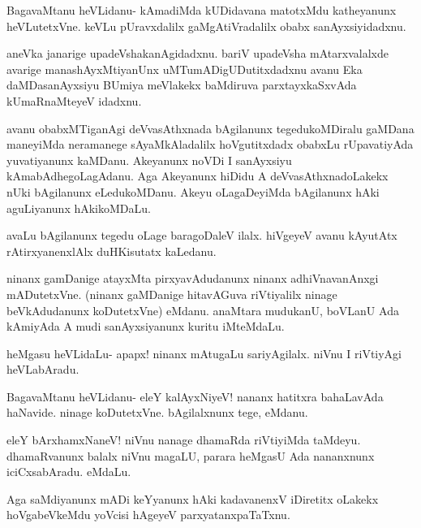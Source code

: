 \documentclass{article}
\begin{document}
\begin{mng}%
BagavaMtanu heVLidanu- kAmadiMda kUDidavana matotxMdu katheyanunx 
heVLutetxVne. keVLu pUravxdalilx gaMgAtiVradalilx obabx sanAyxsiyidadxnu.
\end{mng}

\begin{mng}%
aneVka janarige upadeVshakanAgidadxnu. bariV upadeVsha mAtarxvalalxde
avarige manashAyxMtiyanUnx uMTumADigUDutitxdadxnu avanu Eka
daMDasanAyxsiyu BUmiya meVlakekx baMdiruva parxtayxkaSxvAda kUmaRnaMteyeV
idadxnu.
\end{mng}

\begin{mng}%
avanu obabxMTiganAgi deVvasAthxnada bAgilanunx tegedukoMDiralu
gaMDana maneyiMda neramanege sAyaMkAladalilx hoVgutitxdadx obabxLu
rUpavatiyAda yuvatiyanunx kaMDanu. Akeyanunx noVDi I sanAyxsiyu
kAmabAdhegoLagAdanu. Aga Akeyanunx hiDidu A deVvasAthxnadoLakekx
nUki bAgilanunx eLedukoMDanu. Akeyu oLagaDeyiMda bAgilanunx hAki
aguLiyanunx hAkikoMDaLu.
\end{mng}

\begin{mng}%
avaLu bAgilanunx tegedu oLage baragoDaleV ilalx. hiVgeyeV
avanu kAyutAtx rAtirxyanenxlAlx duHKisutatx kaLedanu.
\end{mng}

\begin{mng}%
ninanx gamDanige atayxMta pirxyavAdudanunx ninanx adhiVnavanAnxgi
mADutetxVne. (ninanx gaMDanige hitavAGuva riVtiyalilx ninage beVkAdudanunx
koDutetxVne) eMdanu. anaMtara mudukanU, boVLanU Ada kAmiyAda
A mudi sanAyxsiyanunx kuritu iMteMdaLu.
\end{mng}

\begin{mng}%
heMgasu heVLidaLu- apapx! ninanx mAtugaLu sariyAgilalx.
niVnu I riVtiyAgi heVLabAradu.
\end{mng}

\begin{mng}%
BagavaMtanu heVLidanu- eleY kalAyxNiyeV! nananx hatitxra bahaLavAda
haNavide. ninage koDutetxVne. bAgilalxnunx tege, eMdanu.
\end{mng}

\begin{mng}%
eleY bArxhamxNaneV! niVnu nanage dhamaRda riVtiyiMda taMdeyu.
dhamaRvanunx balalx niVnu magaLU, parara heMgasU Ada nananxnunx iciCxsabAradu. eMdaLu.
\end{mng}

\begin{mng}%
Aga saMdiyanunx mADi keYyanunx hAki kadavanenxV iDiretitx
oLakekx hoVgabeVkeMdu yoVcisi hAgeyeV parxyatanxpaTaTxnu.
\end{mng}
\end{document}
